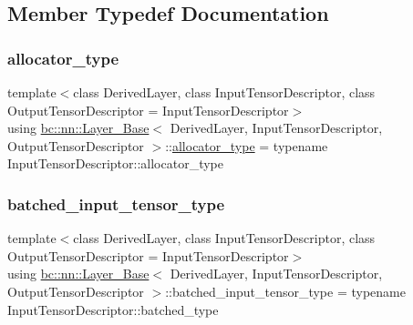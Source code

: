 \subsection{Member Typedef Documentation}
\mbox{\label{structbc_1_1nn_1_1Layer__Base_ab5858d575f0bddc2ef5fc1f9af287866}} 
\subsubsection{\texorpdfstring{allocator\+\_\+type}{allocator\_type}}
{\footnotesize\ttfamily template$<$class Derived\+Layer, class Input\+Tensor\+Descriptor, class Output\+Tensor\+Descriptor = Input\+Tensor\+Descriptor$>$ \\
using \hyperlink{structbc_1_1nn_1_1Layer__Base}{bc\+::nn\+::\+Layer\+\_\+\+Base}$<$ Derived\+Layer, Input\+Tensor\+Descriptor, Output\+Tensor\+Descriptor $>$\+::\hyperlink{structbc_1_1nn_1_1Layer__Base_ab5858d575f0bddc2ef5fc1f9af287866}{allocator\+\_\+type} =  typename Input\+Tensor\+Descriptor\+::allocator\+\_\+type}

\mbox{\label{structbc_1_1nn_1_1Layer__Base_abec4d65c97cd813612fc8e86657e1b81}} 
\subsubsection{\texorpdfstring{batched\+\_\+input\+\_\+tensor\+\_\+type}{batched\_input\_tensor\_type}}
{\footnotesize\ttfamily template$<$class Derived\+Layer, class Input\+Tensor\+Descriptor, class Output\+Tensor\+Descriptor = Input\+Tensor\+Descriptor$>$ \\
using \hyperlink{structbc_1_1nn_1_1Layer__Base}{bc\+::nn\+::\+Layer\+\_\+\+Base}$<$ Derived\+Layer, Input\+Tensor\+Descriptor, Output\+Tensor\+Descriptor $>$\+::batched\+\_\+input\+\_\+tensor\+\_\+type =  typename Input\+Tensor\+Descriptor\+::batched\+\_\+type}

